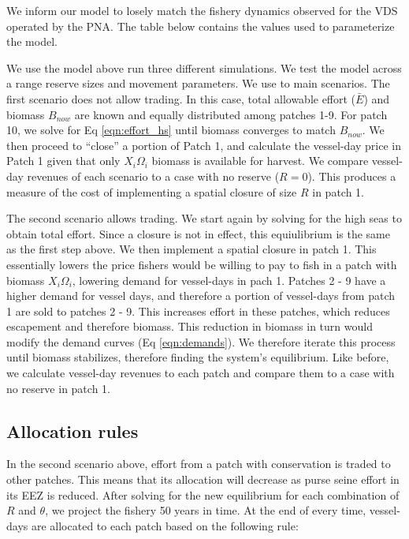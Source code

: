 \documentclass[12pt]{article}
\begin{document}
We inform our model to losely match the fishery dynamics observed for the VDS operated by the PNA. The table below contains the values used to parameterize the model.



We use the model above run three different simulations. We test the model across a range reserve sizes and movement parameters. We use to main scenarios. The first scenario does not allow trading. In this case, total allowable effort ($\bar{E}$) and biomass $B_{now}$ are known and equally distributed among patches 1-9. For patch 10, we solve for Eq \ref{eqn:effort_hs} until biomass converges to match $B_{now}$. We then proceed to ``close'' a portion of Patch 1, and calculate the vessel-day price in Patch 1 given that only $X_i\Omega_i$ biomass is available for harvest. We compare vessel-day revenues of each scenario to a case with no reserve ($R = 0$). This produces a measure of the cost of implementing a spatial closure of size $R$ in patch 1.

The second scenario allows trading. We start again by solving for the high seas to obtain total effort. Since a closure is not in effect, this equiulibrium is the same as the first step above. We then implement a spatial closure in patch 1. This essentially lowers the price fishers would be willing to pay to fish in a patch with biomass $X_i\Omega_i$, lowering demand for vessel-days in pach 1. Patches 2 - 9 have a higher demand for vessel days, and therefore a portion of vessel-days from patch 1 are sold to patches 2 - 9. This increases effort in these patches, which reduces escapement and therefore biomass. This reduction in biomass in turn would modify the demand curves (Eq \ref{eqn:demands}). We therefore iterate this process until biomass stabilizes, therefore finding the system's equilibrium. Like before, we calculate vessel-day revenues to each patch and compare them to a case with no reserve in patch 1.

\subsection{Allocation rules}

In the second scenario above, effort from a patch with conservation is traded to other patches. This means that its allocation will decrease as purse seine effort in its EEZ is reduced. After solving for the new equilibrium for each combination of $R$ and $\theta$, we project the fishery 50 years in time. At the end of every time, vessel-days are allocated to each patch based on the following rule:
\end{document}
